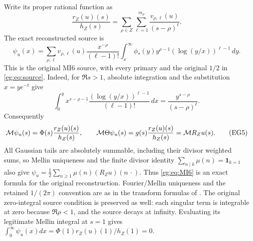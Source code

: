 Write its proper rational function as
\[
 \frac{r_Z(u)(s)}{h_Z(s)}=
 \sum_{\rho\in Z}\sum_{\ell=1}^{m_\rho}
                  \frac{v_{\rho,\ell}(u)}{(s-\rho)^\ell}.
 \tag{EG3}\label{eg:eq:rational-source}
\]
The exact reconstructed source is
\[
 \psi_u(x)=\sum_{\rho,\ell}v_{\rho,\ell}(u)
 \frac{x^{-\rho}}{(\ell-1)!}
 \int_x^\infty\phi_*(y)y^{\rho-1}
                         (\log(y/x))^{\ell-1}\,dy.
 \tag{EG4}\label{eg:eq:MI6}
\]
This is the original MI6 source, with every primary and the original
$1/2$ in \eqref{eg:eq:source}. Indeed, for $\Re s>1$, absolute integration
and the substitution $x=ye^{-t}$ give
\[
 \int_0^y x^{s-\rho-1}\frac{(\log(y/x))^{\ell-1}}{(\ell-1)!}\,dx
       =\frac{y^{s-\rho}}{(s-\rho)^\ell}.
\]
Consequently
\[
 \mathcal M\psi_u(s)=\Phi(s)\frac{r_Z(u)(s)}{h_Z(s)},\qquad
 \mathcal M\Theta\psi_u(s)=g(s)\frac{r_Z(u)(s)}{h_Z(s)}=\mathcal M R_Zu(s).
 \tag{EG5}\label{eg:eq:source-Mellin}
\]
All Gaussian tails are absolutely summable, including their divisor
weighted sums, so Mellin uniqueness and the finite divisor identity
$\sum_{n\mid k}\mu(n)=\mathbf1_{k=1}$ also give
$\psi_u=\frac12\sum_{n\ge1}\mu(n)(R_Zu)(n\,\cdot)$.
Thus \eqref{eg:eq:MI6} is an exact formula for the original reconstruction.
Fourier/Mellin uniqueness and the retained $1/(2\pi)$ convention are
as in the transform formulas of \cite{eg:DLMFTransforms}.
The original zero-integral source condition is preserved as well:
each singular term is integrable at zero because $\Re\rho<1$, and
the source decays at infinity. Evaluating its legitimate Mellin
integral at $s=1$ gives
$\int_0^\infty\psi_u(x)dx=\Phi(1)r_Z(u)(1)/h_Z(1)=0$.

